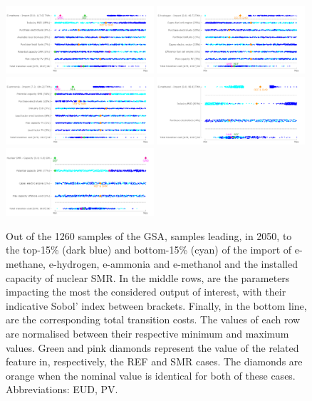 \documentclass[11pt,twoside,a4paper,english]{article}
\begin{document}
\begin{figure}[!htbp]
\centering
\includegraphics[width=0.49\textwidth]{figures/UQ_Gas_samples.pdf}
\includegraphics[width=0.49\textwidth]{figures/UQ_H2_samples.pdf}
\includegraphics[width=0.49\textwidth]{figures/UQ_Ammonia_samples.pdf}
\includegraphics[width=0.49\textwidth]{figures/UQ_Methanol_samples.pdf}
\includegraphics[width=0.49\textwidth]{figures/UQ_SMR_samples.pdf}
\caption{Out of the 1260 samples of the \gls{GSA}, samples leading, in 2050, to the top-15\% (dark blue) and bottom-15\% (cyan) of the import of e-methane, e-hydrogen, e-ammonia and e-methanol and the installed capacity of nuclear SMR. In the middle rows, are the parameters impacting the most the considered output of interest, with their indicative Sobol' index between brackets. Finally, in the bottom line, are the corresponding total transition costs. The values of each row are normalised between their respective minimum and maximum values. Green and pink diamonds represent the value of the related feature in, respectively, the REF and SMR cases. The diamonds are orange when the nominal value is identical for both of these cases. Abbreviations: \acrfull{EUD}, \acrfull{PV}.}
\label{fig:results_uq_samples}
\end{figure}
\end{document}
